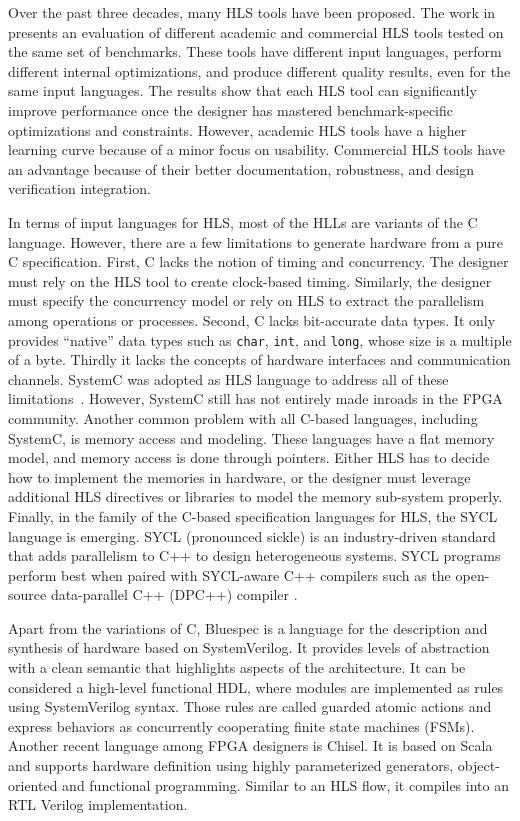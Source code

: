 Over the past three decades, many HLS tools have been proposed. The work in \cite{survey_evaluation} presents an evaluation of different academic and commercial HLS tools tested on the same set of benchmarks. These tools have different input languages, perform different internal optimizations, and produce different quality results, even for the same input languages. The results show that each HLS tool can significantly improve performance once the designer has mastered benchmark-specific optimizations and constraints. However, academic HLS tools have a higher learning curve because of a minor focus on usability. Commercial HLS tools have an advantage because of their better documentation, robustness, and design verification integration.

In terms of input languages for HLS, most of the HLLs are variants of the C language. However, there are a few limitations to generate hardware from a pure C specification. First, C lacks the notion of timing and concurrency. The designer must rely on the HLS tool to create clock-based timing. Similarly, the designer must specify the concurrency model or rely on HLS to extract the parallelism among operations or processes. Second, C lacks bit-accurate data types. It only provides ``native'' data types such as \texttt{char}, \texttt{int}, and \texttt{long}, whose size is a multiple of a byte. Thirdly it lacks the concepts of hardware interfaces and communication channels. SystemC was adopted as HLS language to address all of these limitations~\cite{6838614}. However, SystemC still has not entirely made inroads in the FPGA community. Another common problem with all C-based languages, including SystemC, is memory access and modeling. These languages have a flat memory model, and memory access is done through pointers. Either HLS has to decide how to implement the memories in hardware, or the designer must leverage additional HLS directives or libraries to model the memory sub-system properly. Finally, in the family of the C-based specification languages for HLS, the SYCL language is emerging. SYCL (pronounced sickle) is an industry-driven standard that adds parallelism to C++ to design heterogeneous systems. SYCL programs perform best when paired with SYCL-aware C++ compilers such as the open-source data-parallel C++ (DPC++) compiler \cite{dpcplus}.

Apart from the variations of C, Bluespec is a language for the description and synthesis of hardware based on SystemVerilog. It provides levels of abstraction with a clean semantic that highlights aspects of the architecture. It can be considered a high-level functional HDL, where modules are implemented as rules using SystemVerilog syntax. Those rules are called guarded atomic actions and express behaviors as concurrently cooperating finite state machines (FSMs). Another recent language among FPGA designers is Chisel. It is based on Scala and supports hardware definition using highly parameterized generators, object-oriented and functional programming. Similar to an HLS flow, it compiles into an RTL Verilog implementation. 

